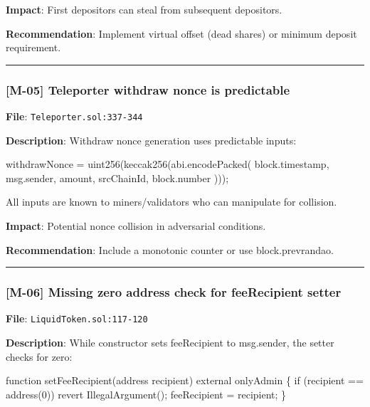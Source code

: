 \documentclass[
]{article}
\newenvironment{Shaded}{}{}
\newcommand{\NormalTok}[1]{#1}
\begin{document}
\textbf{Impact}: First depositors can steal from subsequent depositors.

\textbf{Recommendation}: Implement virtual offset (dead shares) or
minimum deposit requirement.

\begin{center}\rule{0.5\linewidth}{0.5pt}\end{center}

\subsubsection{{[}M-05{]} Teleporter withdraw nonce is
predictable}\label{m-05-teleporter-withdraw-nonce-is-predictable}

\textbf{File}: \texttt{Teleporter.sol:337-344}

\textbf{Description}: Withdraw nonce generation uses predictable inputs:

\begin{Shaded}
\begin{Highlighting}[]
\NormalTok{withdrawNonce = uint256(keccak256(abi.encodePacked(}
\NormalTok{    block.timestamp,}
\NormalTok{    msg.sender,}
\NormalTok{    amount,}
\NormalTok{    srcChainId,}
\NormalTok{    block.number}
\NormalTok{)));}
\end{Highlighting}
\end{Shaded}

All inputs are known to miners/validators who can manipulate for
collision.

\textbf{Impact}: Potential nonce collision in adversarial conditions.

\textbf{Recommendation}: Include a monotonic counter or use
block.prevrandao.

\begin{center}\rule{0.5\linewidth}{0.5pt}\end{center}

\subsubsection{{[}M-06{]} Missing zero address check for feeRecipient
setter}\label{m-06-missing-zero-address-check-for-feerecipient-setter}

\textbf{File}: \texttt{LiquidToken.sol:117-120}

\textbf{Description}: While constructor sets feeRecipient to msg.sender,
the setter checks for zero:

\begin{Shaded}
\begin{Highlighting}[]
\NormalTok{function setFeeRecipient(address recipient) external onlyAdmin \{}
\NormalTok{    if (recipient == address(0)) revert IllegalArgument();}
\NormalTok{    feeRecipient = recipient;}
\NormalTok{\}}
\end{Highlighting}
\end{Shaded}
\end{document}
